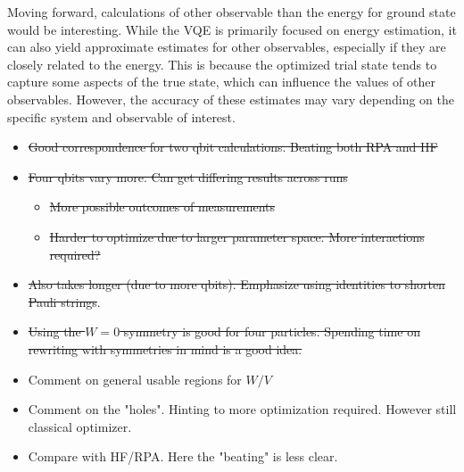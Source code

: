 Moving forward, calculations of other observable than the energy for ground state would be interesting. While the VQE is primarily focused on energy estimation, it can also yield approximate estimates for other observables, especially if they are closely related to the energy. This is because the optimized trial state tends to capture some aspects of the true state, which can influence the values of other observables. However, the accuracy of these estimates may vary depending on the specific system and observable of interest.
\begin{itemize}
    \item \st{Good correspondence for two qbit calculations. Beating both RPA and HF} 
    \item \st{Four qbits vary more. Can get differing results across runs} \begin{itemize}
        \item \st{More possible outcomes of measurements}
        \item \st{Harder to optimize due to larger parameter space. More interactions required?}
    \end{itemize}  
    \item \st{Also takes longer (due to more qbits). Emphasize using identities to shorten Pauli strings}.
    \item \st{Using the $W=0$ symmetry is good for four particles. Spending time on rewriting with symmetries in mind is a good idea.} 
    \item Comment on general usable regions for $W/V$
    \item Comment on the "holes". Hinting to more optimization required. However still classical optimizer. 
    \item Compare with HF/RPA. Here the "beating" is less clear.
\end{itemize}